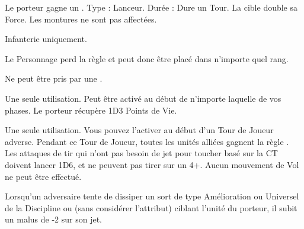 \armytalismans

\startpricelist

 Le porteur gagne un .\newline
Type : Lanceur. Durée : Dure un Tour.\newline
La cible double sa Force. Les montures ne sont pas affectées.%

\endpricelist

\armyenchanteditems

\startpricelist

Infanterie uniquement.

Le Personnage perd la règle \firstinrank{} et peut donc être placé dans n'importe quel rang.

Ne peut être pris par une \largetarget{}.

Une seule utilisation. Peut être activé au début de n'importe laquelle de vos phases. Le porteur récupère 1D3 Points de Vie.
\endpricelist

\armymagicalbanners

\startpricelist

Une seule utilisation. Vous pouvez l'activer au début d'un Tour de Joueur adverse. Pendant ce Tour de Joueur, toutes les unités alliées gagnent la règle \hardtarget{}. Les attaques de tir qui n'ont pas besoin de jet pour toucher basé sur la CT doivent lancer 1D6, et ne peuvent pas tirer sur un 4+. Aucun mouvement de Vol ne peut être effectué.

Lorsqu'un adversaire tente de dissiper un sort de type Amélioration ou Universel de la Discipline \ruin{} ou \disease{} (sans considérer l'attribut) ciblant l'unité du porteur, il subit un malus de -2 sur son jet.

\endpricelist

\closearmymagicalitems








\quickrefsheettitle

